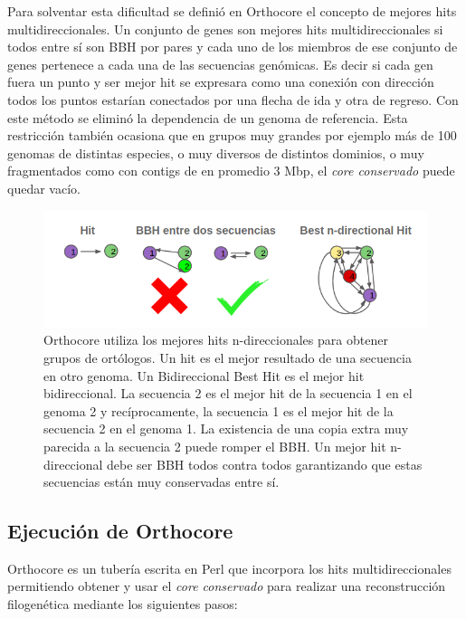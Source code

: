 \documentclass[12pt,twoside]{reedthesis}
\begin{document}
  Para solventar esta dificultad se definió en Orthocore el concepto de
  mejores hits multidireccionales. Un conjunto de genes son mejores hits
  multidireccionales si todos entre sí son BBH por pares y cada uno de los
  miembros de ese conjunto de genes pertenece a cada una de las secuencias
  genómicas. Es decir si cada gen fuera un punto y ser mejor hit se
  expresara como una conexión con dirección todos los puntos estarían
  conectados por una flecha de ida y otra de regreso. Con este método se
  eliminó la dependencia de un genoma de referencia. Esta restricción
  también ocasiona que en grupos muy grandes por ejemplo más de 100
  genomas de distintas especies, o muy diversos de distintos dominios, o
  muy fragmentados como con contigs de en promedio 3 Mbp, el \emph{core
  conservado} puede quedar vacío.
  
  \begin{figure}[h!tbp]
  \centering
  \includegraphics[angle = 0,scale = .55]{chapter1/Best-n-directional.png}
  \caption[Los mejores hits n-direccionales generalizan a los $Bidirectional~Best~Hits$]{\footnotesize{Orthocore utiliza los mejores hits n-direccionales para obtener grupos de ortólogos. Un hit es el mejor resultado de una secuencia en otro genoma. Un Bidireccional Best Hit es el mejor hit bidireccional. La secuencia 2 es el mejor hit de la secuencia 1 en el genoma 2 y recíprocamente, la secuencia 1 es el mejor hit de la secuencia 2 en el genoma 1. La existencia de una copia extra muy parecida a la secuencia 2 puede romper el BBH. Un mejor hit n-direccional debe ser BBH todos contra todos garantizando que estas secuencias están muy conservadas entre sí.}}
  \label{fig:Best-n-directional}
  \end{figure}
  
  \subsection{Ejecución de Orthocore}\label{ejecucion-de-orthocore}
  
  Orthocore es un tubería escrita en Perl que incorpora los hits
  multidireccionales permitiendo obtener y usar el \emph{core conservado}
  para realizar una reconstrucción filogenética mediante los siguientes
  pasos:
  
\end{document}
